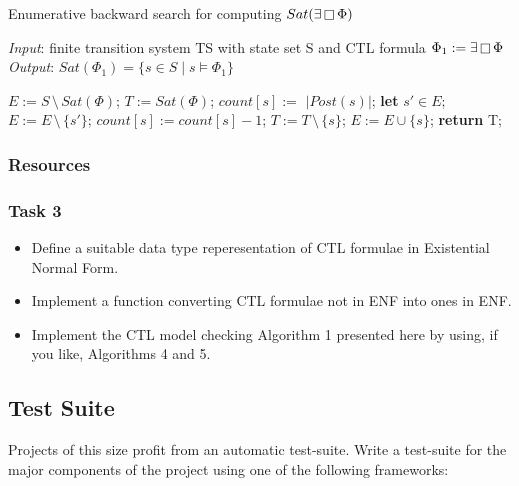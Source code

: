\documentclass{article}
\begin{document}
\begin{algorithm}[H]
    \caption{Enumerative backward search for computing $Sat(\exists \mathop{\Box} \Phi)$}
    \hspace*{\algorithmicindent} \emph{Input}: finite transition system TS with state set S and CTL formula $\Phi_1 := \exists \mathop{\Box} \Phi$ \\
    \hspace*{\algorithmicindent} \emph{Output}: $Sat(\Phi_1) = \{ s \in S \mid s \vDash \Phi_1 \}$
    \begin{algorithmic}[1]
        \State $E := S \, \setminus \, Sat(\Phi)$;
        \State $T := Sat(\Phi)$;
            \State $count[s] := \, \, | Post(s) | $; 
        \EndFor 
            \State \textbf{let} $s' \in E$;
            \State $E := E \, \setminus \, \{ s' \}$;
                    \State $count[s] := count[s] -1$;
                        \State $T := T \, \setminus \, \{s\}$;
                        \State $E := E \cup \{s\}$;
                    \EndIf 
                \EndIf
            \EndFor
        \EndWhile
    \State \textbf{return} T;
    \end{algorithmic}
\end{algorithm}



\subsubsection{Resources}
\cite[Paragraph 6.4]{BaKa}

\color{red}
\subsubsection*{Task 3}
\begin{itemize}
    \item Define a suitable data type reperesentation of CTL formulae in Existential Normal Form.
    \item Implement a function converting CTL formulae not in ENF into ones in ENF.
    \item Implement the CTL model checking Algorithm 1 presented here by using, if you like, Algorithms 4 and 5.
\end{itemize}

\color{black}

\subsection{Test Suite}
\label{subsec-testsuite}
Projects of this size profit from an automatic test-suite. 
Write a test-suite for the major components of the project using one of the following frameworks:
\end{document}
